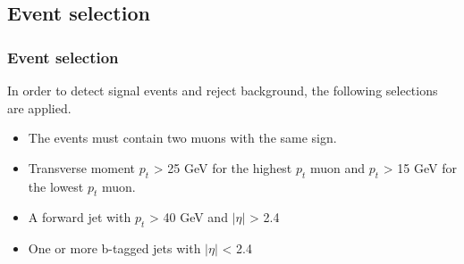 \documentclass[11pt]{beamer}
\begin{document}
\begin{frame}
\subsection{Event selection}
\frametitle{Event selection}
In order to detect signal events and reject background, the following selections are applied. 
\begin{itemize}
	\item The events must contain two muons with the same sign.
	\item Transverse moment $p_{t}$ > 25 GeV for the highest $p_t$ muon and $p_{t}$ > 15 GeV for the lowest $p_t$ muon.
	\item A forward jet with $p_t$ > 40 GeV and $|\eta|$ > 2.4
	\item One or more b-tagged jets with $|\eta|$ < 2.4
\end{itemize}
\end{frame}
\end{document}
